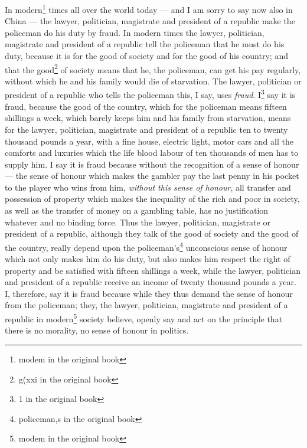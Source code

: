 In modern\footnote{modem in the original book} times all over the world today --- and I am sorry to say now also in China --- the lawyer, politician, magistrate and president of a republic make the policeman do his duty by fraud.
In modern times the lawyer, politician, magistrate and president of a republic tell the policeman that he must do his duty, because it is for the good of society and for the good of his country; and that the good\footnote{g(xxi in the original book} of society means that he, the policeman, can get his pay regularly, without which he and his family would die of starvation.
The lawyer, politician or president of a republic who tells the policeman this, I say, uses \emph{fraud}.
I\footnote{1 in the original book} say it is fraud, because the good of the country, which for the policeman means fifteen shillings a week, which barely keeps him and his family from starvation, means for the lawyer, politician, magistrate and president of a republic ten to twenty thousand pounds a year, with a fine house, electric light, motor cars and all the comforts and luxuries which the life blood labour of ten thousands of men has to supply him.
I say it is fraud because without the recognition of a sense of honour --- the sense of honour which makes the gambler pay the last penny in his pocket to the player who wins from him, \emph{without this sense of honour}, all transfer and possession of property which makes the inequality of the rich and poor in society, as well as the transfer of money on a gambling table, has no justification whatever and no binding force.
Thus the lawyer, politician, magistrate or president of a republic, although they talk of the good of society and the good of the country, really depend upon the policeman's\footnote{policeman,s in the original book} unconscious sense of honour which not only makes him do his duty, but also makes him respect the right of property and be satisfied with fifteen shillings a week, while the lawyer, politician and president of a republic receive an income of twenty thousand pounds a year.
I, therefore, say it is fraud because while they thus demand the sense of honour from the policeman; they, the lawyer, politician, magistrate and president of a republic in modern\footnote{modem in the original book} society believe, openly say and act on the principle that there is no morality, no sense of honour in politics.

